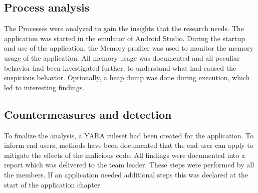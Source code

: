 \subsection{Process analysis}
The Processes were analyzed to gain the insights that the research needs.
The application was started in the emulator of Android Studio.
During the startup and use of the application, the Memory profiler was used to monitor the memory usage of the application.
All memory usage was documented and all peculiar behavior had been investigated further, to understand what had caused the suspicious behavior.
Optionally, a heap dump was done during execution, which led to interesting findings.

\subsection{Countermeasures and detection}

To finalize the analysis, a YARA ruleset had been created for the application.
To inform end users, methods have been documented that the end user can apply to mitigate the effects of the malicious code.
All findings were documented into a report which was delivered to the team leader.
These steps were performed by all the members.
If an application needed additional steps this was declared at the start of the application chapter.
